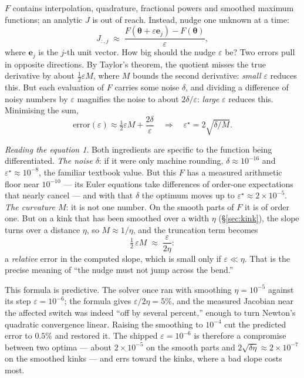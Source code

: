 \documentclass[10pt,a4paper]{article}
\theoremstyle{plain}
\theoremstyle{remark}
\newtheorem*{reading}{Reading the equation}
\newcommand{\pol}{\bm{\theta}}
\begin{document}
$F$ contains interpolation, quadrature, fractional powers and smoothed maximum functions; an
analytic $J$ is out of reach. Instead, nudge one unknown at a time:
\begin{equation}
  J_{:,j} \;\approx\; \frac{F(\pol+\varepsilon\bm e_j) - F(\pol)}{\varepsilon},
  \label{eq:fd}
\end{equation}
where $\bm e_j$ is the $j$-th unit vector. How big should the nudge $\varepsilon$ be? Two errors
pull in opposite directions. By Taylor's theorem, the quotient misses the true derivative by
about $\tfrac12\varepsilon M$, where $M$ bounds the second derivative: \emph{small} $\varepsilon$
reduces this. But each evaluation of $F$ carries some noise $\delta$, and dividing a difference
of noisy numbers by $\varepsilon$ magnifies the noise to about $2\delta/\varepsilon$:
\emph{large} $\varepsilon$ reduces this. Minimising the sum,
\begin{equation}
  \text{error}(\varepsilon) \approx \tfrac12\varepsilon M + \frac{2\delta}{\varepsilon}
  \quad\Longrightarrow\quad
  \varepsilon^\star = 2\sqrt{\delta/M}.
  \label{eq:fdstep}
\end{equation}

\begin{reading}
Both ingredients are specific to the function being differentiated. \emph{The noise $\delta$}:
if it were only machine rounding, $\delta\approx10^{-16}$ and $\varepsilon^\star\approx10^{-8}$,
the familiar textbook value. But this $F$ has a measured arithmetic floor near $10^{-10}$ ---
its Euler equations take differences of order-one expectations that nearly cancel --- and with
that $\delta$ the optimum moves up to $\varepsilon^\star\approx2\times10^{-5}$. \emph{The
curvature $M$}: it is not one number. On the smooth parts of $F$ it is of order one. But on a
kink that has been smoothed over a width $\eta$ (\S\ref{sec:kink}), the slope turns over a
distance $\eta$, so $M\approx1/\eta$, and the truncation term becomes
\begin{equation*}
  \tfrac12\,\varepsilon M \;\approx\; \frac{\varepsilon}{2\eta}:
\end{equation*}
a \emph{relative} error in the computed slope, which is small only if $\varepsilon\ll\eta$.
That is the precise meaning of ``the nudge must not jump across the bend.''
\end{reading}

\noindent This formula is predictive. The solver once ran with smoothing $\eta=10^{-5}$ against
its step $\varepsilon=10^{-6}$; the formula gives $\varepsilon/2\eta = 5\%$, and the measured
Jacobian near the affected switch was indeed ``off by several percent,'' enough to turn
Newton's quadratic convergence linear. Raising the smoothing to $10^{-4}$ cut the predicted error
to $0.5\%$ and restored it. The shipped $\varepsilon = 10^{-6}$ is therefore a compromise between
two optima --- about $2\times10^{-5}$ on the smooth parts and $2\sqrt{\delta\eta}\approx2\times10^{-7}$
on the smoothed kinks --- and errs toward the kinks, where a bad slope costs most.
\end{document}
